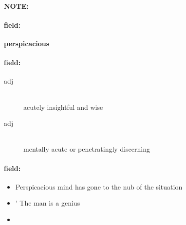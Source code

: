 \documentclass[12pt]{article}
\newenvironment{note}{\paragraph{NOTE:}}{}
\newenvironment{field}{\paragraph{field:}}{}
\begin{document}
\begin{note}
\begin{field}
\textbf{\large perspicacious}
\end{field}


\begin{field}
\begin{description}
\item[adj] \hfill \\ 
acutely insightful and wise

\item[adj] \hfill \\ 
mentally acute or penetratingly discerning

\end{description}
\end{field}

\begin{field}
\begin{itemize}
\item Perspicacious mind has gone to the nub of the situation
\item  ' The man is a genius
\item 
\end{itemize}
\end{field}
\end{note}
\end{document}
